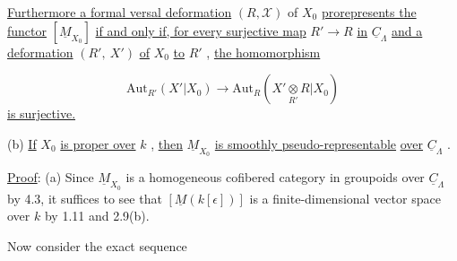 \begin{center}
\end{center}
\underline{Furthermore a formal versal deformation}  $(R,\mathcal{X})$  of  $X_{0}$  \underline{prorepresents the functor} $[\underline{M}_{X_{0}}]$  \underline{if and only if, for every surjective map}  $R' \to R$  \underline{in}  $\underline{C}_{\Lambda}$  \underline{and a deformation} $(R',\ X')$  \underline{of}  $X_{0}$  \underline{to}  $R'$ , \underline{the homomorphism}

\begin{equation*}
\mathrm{Aut}_{R'}(X'|X_{0}) \to \mathrm{Aut}_{R}(X' \underset{R'}{\otimes} R|X_{0})
\end{equation*}
\underline{is surjective.}

(b)  \underline{If}  $X_{0}$  \underline{is proper over}  $k$ , \underline{then}  $\underline{M}_{X_{0}}$  \underline{is smoothly pseudo-representable}
\underline{over} $\underline{C}_{\Lambda}$ .

\underline{Proof}:  (a)  Since  $\underline{M}_{X_{0}}$  is a homogeneous cofibered category in groupoids over $\underline{C}_{\Lambda}$ by 4.3, it suffices to see that  $[\underline{M}(k[\epsilon])]$  is a finite-dimensional vector space over  $k$  by 1.11 and 2.9(b).

Now consider the exact sequence


